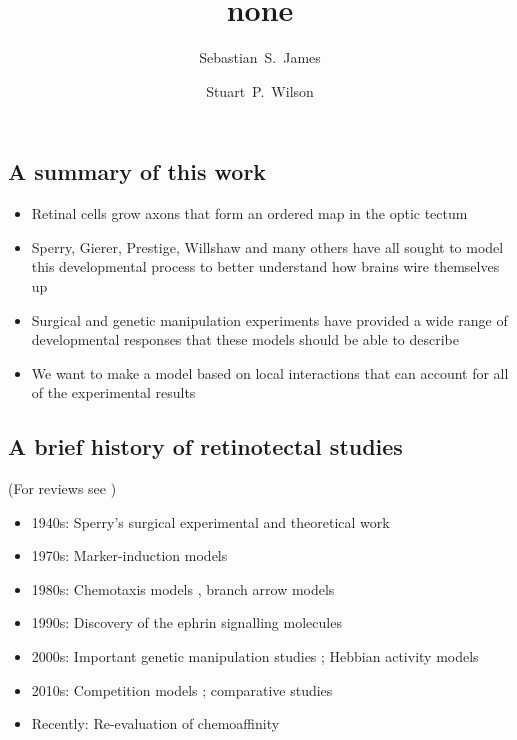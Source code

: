 \documentclass[9pt]{elife} %
\title {none}
\author[1]{Sebastian~S.~James}
\author[1*]{Stuart~P.~Wilson}
\affil[1]{Department of Psychology, The University of Sheffield, Sheffield, United Kingdom.}
\begin{document}

\subsection{A summary of this work}

\begin{itemize}
\item Retinal cells grow axons that form an ordered map in the optic tectum
\item Sperry, Gierer, Prestige, Willshaw and many others have all sought to model this
  developmental process to better understand how brains wire themselves up
\item Surgical and genetic manipulation experiments have provided a wide range
  of developmental responses that these models should be able to describe
\item We want to make a model based on local interactions that can account for
  all of the experimental results
\end{itemize}

\subsection{A brief history of retinotectal studies}

(For reviews see \citealp{Prestige1975,Goodhill2005})

\begin{itemize}
\item 1940s: Sperry's surgical experimental and theoretical work
  \citep{sperry_reestablishment_1942,sperry_visuomotor_1943,sperry_chemoaffinity_1963}
\item 1970s: Marker-induction models \citep{Prestige1975,Willshaw2006}
\item 1980s: Chemotaxis models \citep{Gierer1983,Gierer1987}, branch arrow
  models \citep{overton_extended_1982}
\item 1990s: Discovery of the ephrin signalling molecules \citep{nakamoto_topographically_1996}
\item 2000s: Important genetic manipulation studies
  \citep{brown_topographic_2000,reber_relative_2004}; Hebbian activity models \citep{Tsigankov2006,Tsigankov2010}
\item 2010s: Competition models \citep{Triplett2011,Simpson2011}; comparative
  studies \citep{hjorth_quantitative_2015}
\item Recently: Re-evaluation of chemoaffinity \citep{Sterratt2013,naoki_revisiting_2017}
\end{itemize}
\end{document}
